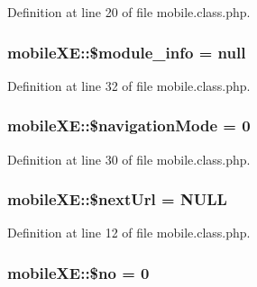 Definition at line 20 of file mobile.\+class.\+php.

\subsubsection[{\texorpdfstring{\$module\+\_\+info}{$module_info}}]{\setlength{\rightskip}{0pt plus 5cm}mobile\+X\+E\+::\$module\+\_\+info = {\bf null}}\hypertarget{classmobileXE_a926916a0195e056ccfdaf284e56b0ea6}{}\label{classmobileXE_a926916a0195e056ccfdaf284e56b0ea6}


Definition at line 32 of file mobile.\+class.\+php.

\subsubsection[{\texorpdfstring{\$navigation\+Mode}{$navigationMode}}]{\setlength{\rightskip}{0pt plus 5cm}mobile\+X\+E\+::\$navigation\+Mode = 0}\hypertarget{classmobileXE_aa6e85b2d6fe4667d7d0a3a2b3f13bd12}{}\label{classmobileXE_aa6e85b2d6fe4667d7d0a3a2b3f13bd12}


Definition at line 30 of file mobile.\+class.\+php.

\subsubsection[{\texorpdfstring{\$next\+Url}{$nextUrl}}]{\setlength{\rightskip}{0pt plus 5cm}mobile\+X\+E\+::\$next\+Url = N\+U\+LL}\hypertarget{classmobileXE_adbdb5909b975bb776f91817d2392aaca}{}\label{classmobileXE_adbdb5909b975bb776f91817d2392aaca}


Definition at line 12 of file mobile.\+class.\+php.

\subsubsection[{\texorpdfstring{\$no}{$no}}]{\setlength{\rightskip}{0pt plus 5cm}mobile\+X\+E\+::\$no = 0}\hypertarget{classmobileXE_a497e828014cdb6eaef56dd42d0f816e6}{}\label{classmobileXE_a497e828014cdb6eaef56dd42d0f816e6}


